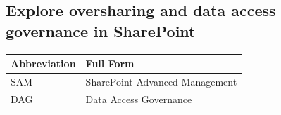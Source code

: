 \documentclass[10pt]{article}
\begin{document}
\subsection{Explore oversharing and data access governance in SharePoint}

\begin{center}
\begin{tabular}{>{\raggedright\arraybackslash}p{} >{\raggedright\arraybackslash}p{}}
\toprule
\textbf{Abbreviation} & \textbf{Full Form} \\
\midrule
SAM & SharePoint Advanced Management \\
DAG & Data Access Governance \\
\end{tabular}
\end{center}
\end{document}
